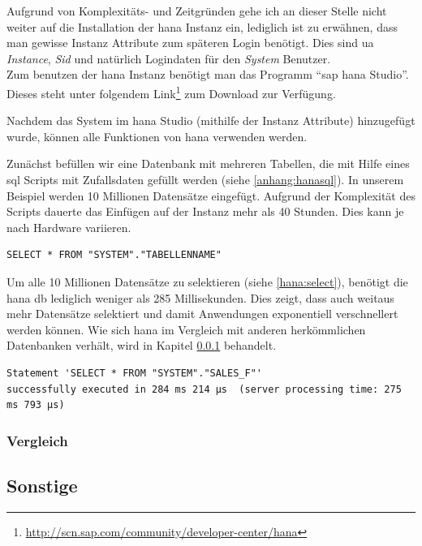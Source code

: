 Aufgrund von Komplexitäts- und Zeitgründen gehe ich an dieser Stelle nicht weiter auf die Installation der \gls{hana} Instanz ein, lediglich ist zu erwähnen, dass man gewisse Instanz Attribute zum späteren Login benötigt. Dies sind \gls{ua} \emph{Instance}, \emph{Sid} und natürlich Logindaten für den \emph{System} Benutzer.\\
Zum benutzen der \gls{hana} Instanz benötigt man das Programm "`\gls{sap} \gls{hana} Studio"'. Dieses steht unter folgendem Link\footnote{\url{http://scn.sap.com/community/developer-center/hana}} zum Download zur Verfügung.

Nachdem das System im \gls{hana} Studio (mithilfe der Instanz Attribute) hinzugefügt wurde, können alle Funktionen von \gls{hana} verwenden werden.

Zunächst befüllen wir eine Datenbank mit mehreren Tabellen, die mit Hilfe eines \gls{sql} Scripts mit Zufallsdaten gefüllt werden (siehe \ref{anhang:hanasql}). In unserem Beispiel werden 10 Millionen Datensätze eingefügt. Aufgrund der Komplexität des Scripts dauerte das Einfügen auf der Instanz mehr als 40 Stunden. Dies kann je nach Hardware variieren.\\

\begin{lstlisting}
SELECT * FROM "SYSTEM"."TABELLENNAME"
\end{lstlisting}

Um alle 10 Millionen Datensätze zu selektieren  (siehe \ref{hana:select}), benötigt die \gls{hana} \gls{db} lediglich weniger als 285 Millisekunden. Dies zeigt, dass auch weitaus mehr Datensätze selektiert und damit Anwendungen exponentiell verschnellert werden können. Wie sich \gls{hana} im Vergleich mit anderen herkömmlichen Datenbanken verhält, wird in Kapitel \ref{sec:db-hana-vgl} behandelt.

\begin{verbatim}
Statement 'SELECT * FROM "SYSTEM"."SALES_F"' 
successfully executed in 284 ms 214 µs  (server processing time: 275 ms 793 µs)
\end{verbatim}


\subsubsection{Vergleich}
\label{sec:db-hana-vgl}

\subsection{Sonstige}
\label{sec:db-sonstige}
